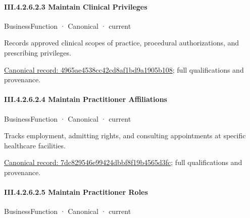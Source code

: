 \paragraph*{III.4.2.6.2.3 Maintain Clinical Privileges}
\label{navigation:III.4.2.6.2.3}

\label{element:4965ae4538cc42cd8af1bd9a1905b108}
{\small BusinessFunction · Canonical · current}\par

Records approved clinical scopes of practice, procedural authorizations, and prescribing privileges.


{\footnotesize \href{../../../../../../../continuum/business/business-function/4965ae4538cc42cd8af1bd9a1905b108.md}{Canonical record: 4965ae4538cc42cd8af1bd9a1905b108}; full qualifications and provenance.}\par
\paragraph*{III.4.2.6.2.4 Maintain Practitioner Affiliations}
\label{navigation:III.4.2.6.2.4}

\label{element:7dc829546e99424dbbf8f19b4565d3fc}
{\small BusinessFunction · Canonical · current}\par

Tracks employment, admitting rights, and consulting appointments at specific healthcare facilities.


{\footnotesize \href{../../../../../../../continuum/business/business-function/7dc829546e99424dbbf8f19b4565d3fc.md}{Canonical record: 7dc829546e99424dbbf8f19b4565d3fc}; full qualifications and provenance.}\par
\paragraph*{III.4.2.6.2.5 Maintain Practitioner Roles}
\label{navigation:III.4.2.6.2.5}

\label{element:08a269d84dad46a58d6b9181b465ddc4}
{\small BusinessFunction · Canonical · current}\par

